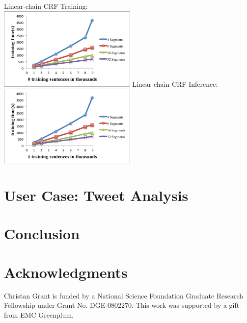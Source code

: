 \documentclass[11pt,letterpaper]{article}
\begin{document}
Linear-chain CRF Training:\\
\includegraphics[height=11em]{training}
Linear-chain CRF Inference:\\
\includegraphics[height=11em]{training}

\section{User Case: Tweet Analysis}
\label{sec:blind}

\section{Conclusion}

\section*{Acknowledgments}
Christan Grant is funded by a National
Science Foundation Graduate Research Fellowship under Grant No. DGE-0802270.
This work was supported by a gift from EMC Greenplum.



\end{document}
